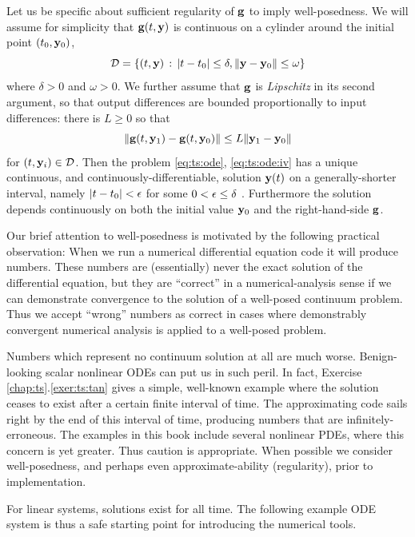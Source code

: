Let us be specific about sufficient regularity of $\mathbf{g}$ to imply well-posedness.  We will assume for simplicity that $\mathbf{g}(t,\mathbf{y})$ is continuous on a cylinder around the initial point $(t_0,\mathbf{y}_0)$,
   $$\mathcal{D} = \{(t,\mathbf{y}) \,:\, |t-t_0| \le \delta, \|\mathbf{y} - \mathbf{y}_0\| \le \omega\}$$
where $\delta > 0$ and $\omega > 0$.  We further assume that $\mathbf{g}$ is \emph{Lipschitz} in its second argument, so that output differences are bounded proportionally to input differences: there is $L\ge 0$ so that
\begin{equation}
\|\mathbf{g}(t,\mathbf{y}_1) - \mathbf{g}(t,\mathbf{y}_0)\| \le L \|\mathbf{y}_1-\mathbf{y}_0\|  \label{eq:ts:glipschitz}
\end{equation}
for $(t,\mathbf{y}_i) \in \mathcal{D}$.  Then the problem \eqref{eq:ts:ode}, \eqref{eq:ts:ode:iv} has a unique continuous, and continuously-differentiable, solution $\mathbf{y}(t)$ on a generally-shorter interval, namely $|t-t_0|<\epsilon$ for some $0 < \epsilon \le \delta$ \citep[section 17.5]{HirschSmaleDevaney2004}.  Furthermore the solution depends continuously on both the initial value $\mathbf{y}_0$ and the right-hand-side $\mathbf{g}$.

Our brief attention to well-posedness is motivated by the following practical observation:  When we run a numerical differential equation code it will produce numbers.  These numbers are (essentially) never the exact solution of the differential equation, but they are ``correct'' in a numerical-analysis sense if we can demonstrate convergence to the solution of a well-posed continuum problem.  Thus we accept ``wrong'' numbers as correct in cases where demonstrably convergent numerical analysis is applied to a well-posed problem.

Numbers which represent no continuum solution at all are much worse.  Benign-looking scalar nonlinear ODEs can put us in such peril.  In fact, Exercise \ref{chap:ts}.\ref{exer:ts:tan} gives a simple, well-known example where the solution ceases to exist after a certain finite interval of time.  The approximating code sails right by the end of this interval of time, producing numbers that are infinitely-erroneous.  The examples in this book include several nonlinear PDEs, where this concern is yet greater.  Thus caution is appropriate.  When possible we consider well-posedness, and perhaps even approximate-ability (regularity), prior to implementation.

For linear systems, solutions exist for all time.  The following example ODE system is thus a safe starting point for introducing the numerical tools.

